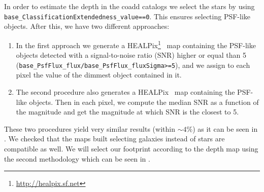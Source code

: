 \documentclass[\docopts]{\docclass}
\begin{document}
In order to estimate the depth in the coadd catalogs we select the stars by using \texttt{base\_ClassificationExtendedness\_value==0}. This ensures selecting
PSF-like objects. After this, we have two different approaches:

\begin{enumerate}
\item In the first approach we generate a HEALPix\footnote{\url{http://healpix.sf.net}}~\citep{2005ApJ...622..759G} map containing the PSF-like objects detected with a signal-to-noise ratio (SNR) higher or equal than 5 (\texttt{base\_PsfFlux\_flux/base\_PsfFlux\_fluxSigma>=5}), and we assign to each pixel the value of the
dimmest object contained in it.
\item The second procedure also generates a HEALPix~\citep{2005ApJ...622..759G} map containing the PSF-like objects. Then in each pixel, we compute the median SNR as a function of the magnitude and get the magnitude at which SNR is the closest to 5.
\end{enumerate}

These two procedures yield very similar results (within $\sim 4\%$) as it can be seen in . We checked that the maps built selecting galaxies instead of stars are compatible as well. We will select our footprint according to the depth map using the second methodology which can be seen in .
\end{document}
